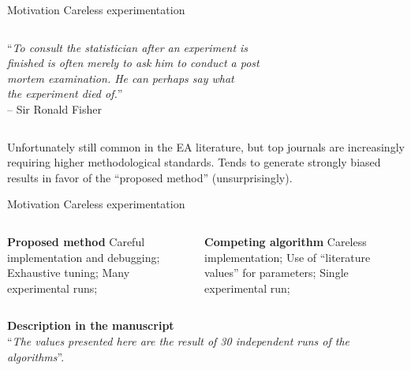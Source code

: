 \documentclass[t]{beamer}
\begin{document}

\begin{ftst}
{Motivation}
{Careless experimentation}
\begin{columns}[c]
\begin{block}{}
\begin{flushright}
``\textit{To consult the statistician after an experiment is\\
finished is often merely to ask him to conduct a post\\
mortem examination. He can perhaps say what\\
the experiment died of.}''\\
{\scriptsize -- Sir Ronald Fisher}
\end{flushright}
\end{block}
\begin{center}
\end{center}
\end{columns}
\vone\vone
Unfortunately still common in the EA literature, but top journals are increasingly requiring higher methodological standards.
\vone
Tends to generate strongly biased results in favor of the ``proposed method'' (unsurprisingly).
%
\end{ftst}


\begin{ftst}
{Motivation}
{Careless experimentation}
%
\begin{columns}
\textbf{Proposed method}
\vhalf
\bitems Careful implementation and debugging;
\spitem Exhaustive tuning;
\spitem Many experimental runs;
\eitem

\textbf{Competing algorithm}
\vhalf
\bitems Careless implementation;
\spitem Use of ``literature values'' for parameters;
\spitem Single experimental run;
\eitem
\end{columns}
\vone\vone\pause
\begin{block}{}
\centering\textbf{Description in the manuscript}\\
\centering``\textit{The values presented here are the result of 30 independent runs of the algorithms}''.
\end{block}
\end{ftst}
\end{document}
